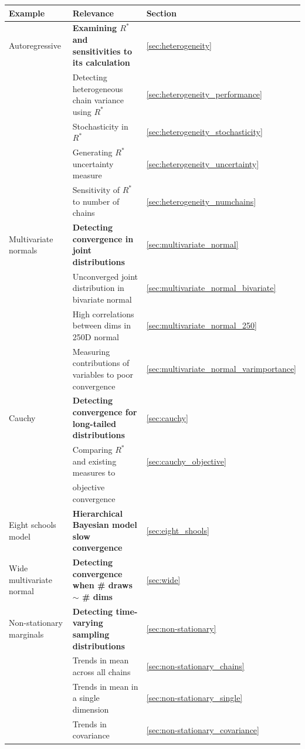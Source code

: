 \documentclass[ba]{imsart}
\numberwithin{equation}{section}
\theoremstyle{plain}
\begin{document}
\begin{table}[]
	\footnotesize
	\begin{tabular}{l|l|l}
		\textbf{Example }&  \textbf{Relevance} & \textbf{Section} \\
		\midrule
		Autoregressive & \textbf{Examining $R^*$ and sensitivities to its calculation} & \ref{sec:heterogeneity} \\
		& Detecting heterogeneous chain variance using $R^*$ & \ref{sec:heterogeneity_performance} \\
		& Stochasticity in $R^*$ & \ref{sec:heterogeneity_stochasticity}\\
		& Generating $R^*$ uncertainty measure & \ref{sec:heterogeneity_uncertainty}\\
		& Sensitivity of $R^*$ to number of chains & \ref{sec:heterogeneity_numchains}\\
		\midrule
		Multivariate normals & \textbf{Detecting convergence in joint distributions} &  \ref{sec:multivariate_normal}\\
		& Unconverged joint distribution in bivariate normal & \ref{sec:multivariate_normal_bivariate}\\
		& High correlations between dims in 250D normal  & \ref{sec:multivariate_normal_250}\\
		& Measuring contributions of variables to poor convergence & \ref{sec:multivariate_normal_varimportance}\\
		\midrule
		Cauchy & \textbf{Detecting convergence for long-tailed distributions} & \ref{sec:cauchy}\\
		& Comparing $R^*$ and existing measures to & \ref{sec:cauchy_objective}\\
		& objective convergence &\\
		\midrule
		Eight schools model & \textbf{Hierarchical Bayesian model slow convergence} & \ref{sec:eight_shools}\\
		\midrule 
		Wide multivariate normal & \textbf{Detecting convergence when \# draws $\sim$ \# dims} & \ref{sec:wide}\\
		\midrule
		Non-stationary marginals & \textbf{Detecting time-varying sampling distributions} & \ref{sec:non-stationary}\\
		& Trends in mean across all chains & \ref{sec:non-stationary_chains}\\
		& Trends in mean in a single dimension & \ref{sec:non-stationary_single}\\
		& Trends in covariance & \ref{sec:non-stationary_covariance}\\

\end{tabular}
\end{table}
\end{document}
